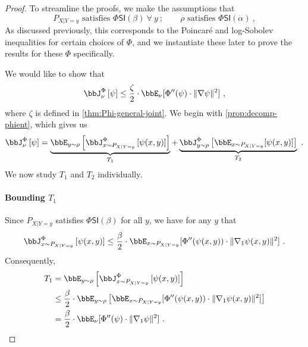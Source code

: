 \documentclass[11pt]{article}
\newcommand{\PhiSI}[1]{\Phi\mathsf{SI}\left(#1\right)}
\newcommand{\Phient}[3]{
    \ensuremath{\if$#3$\bbJ_{#1}^{#2}\else\bbJ_{#1}^{#2}\left[#3\right]\fi}}
\begin{document}
\begin{proof}
To streamline the proofs, we make the assumptions that
\begin{equation*}
    P_{X | Y = y} \text{ satisfies } \PhiSI{\beta} ~\forall ~ y~;\qquad \rho \text{ satisfies } \PhiSI{\alpha}~,
\end{equation*}
As discussed previously, this corresponds to the Poincar\'{e} and log-Sobolev inequalities for certain choices of \(\Phi\), and we instantiate these later to prove the results for these \(\Phi\) specifically.

We would like to show that
\begin{equation*}
    \Phient{\nu}{\Phi}{\psi} \leq \frac{\zeta}{2} \cdot \bbE_{\nu}[\Phi''(\psi) \cdot \|\nabla \psi\|^{2}]~,
\end{equation*}
where \(\zeta\) is defined in \cref{thm:Phi-general-joint}.
We begin with \cref{prop:decomp-phient}, which gives us
\begin{equation*}
    \Phient{\nu}{\Phi}{\psi} = \underbrace{\bbE_{y \sim \rho}\left[\Phient{x \sim P_{X | Y = y}}{\Phi}{\psi(x, y)}\right]}_{T_{1}} + \underbrace{\Phient{y \sim \rho}{\Phi}{\bbE_{x \sim P_{X | Y = y}}[\psi(x, y)]}}_{T_{2}}~.
\end{equation*}
We now study \(T_{1}\) and \(T_{2}\) individually.

\paragraph{Bounding \(T_{1}\)}
Since \(P_{X | Y = y}\) satisfies \(\PhiSI{\beta}\) for all \(y\), we have for any \(y\) that
\begin{equation*}
    \Phient{x \sim P_{X | Y =y}}{\Phi}{\psi(x, y)} \leq \frac{\beta}{2} \cdot \bbE_{x \sim P_{X | Y = y}}[\Phi''(\psi(x, y)) \cdot \|\nabla_{1}\psi(x, y)\|^{2}]~.
\end{equation*}
Consequently,
\begin{align*}
    T_{1} &= \bbE_{y \sim \rho}\left[\Phient{x \sim P_{X | Y = y}}{\Phi}{\psi(x, y)}\right] \\
    &\leq \frac{\beta}{2} \cdot \bbE_{y \sim \rho}\left[\bbE_{x \sim P_{X | Y = y}}[\Phi''(\psi(x, y)) \cdot \|\nabla_{1}\psi(x, y)\|^{2}]\right] \\
    &= \frac{\beta}{2} \cdot \bbE_{\nu}[\Phi''(\psi) \cdot \|\nabla_{1}\psi\|^{2}]~.
\end{align*}


\end{proof}
\end{document}
